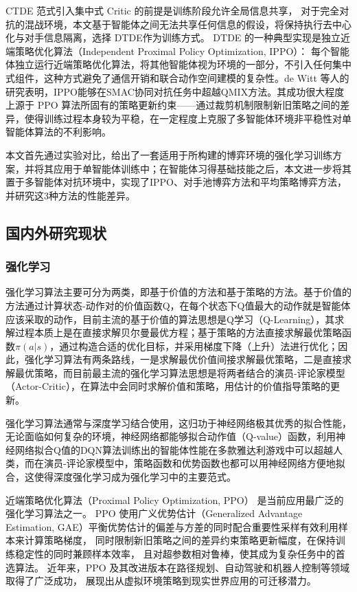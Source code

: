 \documentclass[12pt, a4paper, UTF8]{ctexart}
\numberwithin{equation}{section}
\begin{document}
CTDE 范式引入集中式 Critic 的前提是训练阶段允许全局信息共享，
对于完全对抗的混战环境，本文基于智能体之间无法共享任何信息的假设，将保持执行去中心化与对手信息隔离，选择 DTDE作为训练方式。
DTDE 的一种典型实现是独立近端策略优化算法（Independent Proximal Policy Optimization, IPPO）：
每个智能体独立运行近端策略优化算法，将其他智能体视为环境的一部分，不引入任何集中式组件，这种方式避免了通信开销和联合动作空间建模的复杂性。de Witt 等人\cite{dewitt2020independentlearningneedstarcraft}的研究表明，IPPO能够在SMAC协同对抗任务中超越QMIX方法。其成功很大程度上源于 PPO 算法所固有的策略更新约束——通过裁剪机制限制新旧策略之间的差异，使得训练过程本身较为平稳，在一定程度上克服了多智能体环境非平稳性对单智能体算法的不利影响。

本文首先通过实验对比，给出了一套适用于所构建的博弈环境的强化学习训练方案，并将其应用于单智能体训练中；在智能体习得基础技能之后，本文进一步将其置于多智能体对抗环境中，实现了IPPO、对手池博弈方法和平均策略博弈方法，并研究这3种方法的性能差异。

\subsection{国内外研究现状}
\subsubsection{强化学习}
强化学习算法主要可分为两类，即基于价值的方法和基于策略的方法\cite{kwyqhxxzs2025}。基于价值的方法通过计算状态-动作对的价值函数Q，在每个状态下Q值最大的动作就是智能体应该采取的动作，目前主流的基于价值的算法思想是Q学习（Q-Learning）\cite{watkins1992qlearning}，其求解过程本质上是在直接求解贝尔曼最优方程；基于策略的方法直接求解最优策略函数$\pi(a|s)$，通过构造合适的优化目标，并采用梯度下降（上升）法进行优化；因此，强化学习算法有两条路线，一是求解最优价值间接求解最优策略，二是直接求解最优策略，而目前最主流的强化学习算法思想是将两者结合的演员-评论家模型（Actor-Critic），在算法中会同时求解价值和策略，用估计的价值指导策略的更新。

强化学习算法通常与深度学习结合使用，这归功于神经网络极其优秀的拟合性能\cite{cybenko1989approximation,hornik1989multilayer}，无论面临如何复杂的环境，神经网络都能够拟合动作值（Q-value）函数，利用神经网络拟合Q值的DQN算法训练出的智能体性能在多款雅达利游戏中可以超越人类\cite{mnih2015human}，而在演员-评论家模型中，策略函数和优势函数也都可以用神经网络方便地拟合，这使得深度强化学习成为强化学习中的主要范式。

近端策略优化算法（Proximal Policy Optimization, PPO）\cite{schulman2017ppo}
是当前应用最广泛的强化学习算法之一。
PPO 使用广义优势估计（Generalized Advantage Estimation, GAE）\cite{schulman2015highdimensional}平衡优势估计的偏差与方差的同时配合重要性采样有效利用样本来计算策略梯度，
同时限制新旧策略之间的差异约束策略更新幅度，在保持训练稳定性的同时兼顾样本效率，
且对超参数相对鲁棒，使其成为复杂任务中的首选算法。
近年来，PPO 及其改进版本在路径规划、自动驾驶和机器人控制等领域
取得了广泛成功\cite{lujingguihua20230406,yaoyue2023improvedppo,wanyuhang2025improvedppo}，
展现出从虚拟环境策略到现实世界应用的可迁移潜力。
\end{document}
